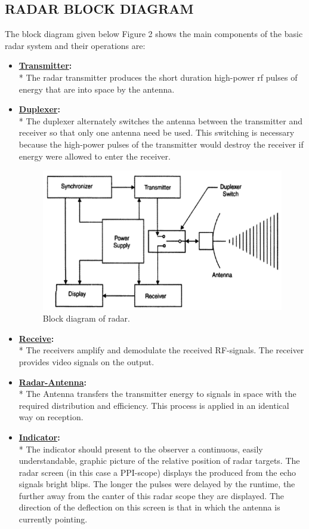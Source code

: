 \documentclass[14pt]{article} %
\begin{document}
\subsection{RADAR BLOCK DIAGRAM}
 The block diagram given below Figure 2 shows the main components of the basic radar system and their operations are:
\begin{itemize}

\item \textbf {\underline{Transmitter}:}
\\* The radar transmitter produces the short duration high-power rf pulses of energy that are into space by the antenna.
\item \textbf {\underline{Duplexer}:}
 \\*     The duplexer alternately switches the antenna between the transmitter and receiver so that only one antenna need be used. This switching is necessary because the high-power pulses of the transmitter would destroy the receiver if energy were allowed to enter the receiver.
      
\begin{figure}[H]
  \includegraphics[width=\linewidth]{RadarBlockDiagram.png}
  \caption{Block diagram of radar.}
  \label{fig:figure 2}
\end{figure}


\item \textbf {\underline{Receive}:}
 \\*     The receivers amplify and demodulate the received RF-signals. The receiver provides video signals on the output.
\item \textbf {\underline{Radar-Antenna}:}
 \\*     The Antenna transfers the transmitter energy to signals in space with the required distribution and efficiency. This process is applied in an identical way on reception.
\item \textbf {\underline{Indicator}:}
\\* The indicator should present to the observer a continuous, easily understandable, graphic picture of the relative position of radar targets. The radar screen (in this case a PPI-scope) displays the produced from the echo signals bright blips. The longer the pulses were delayed by the runtime, the further away from the canter of this radar scope they are displayed. The direction of the deflection on this screen is that in which the antenna is currently pointing.
\end{itemize}
\end{document}
